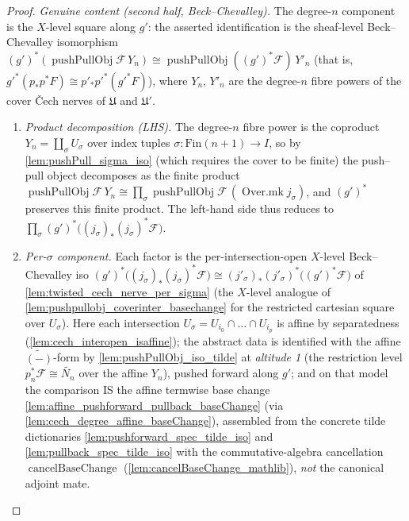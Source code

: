 \begin{proof}
  \emph{Genuine content (second half, Beck--Chevalley).} The degree-\(n\) component
  is the \(X\)-level square along \(g'\): the asserted identification is the sheaf-level
  Beck--Chevalley isomorphism \((g')^*(\operatorname{pushPullObj}\mathcal{F}\, Y_n) \cong
  \operatorname{pushPullObj}((g')^*\mathcal{F})\, Y'_n\) (that is, \(g'^*(p_* p^* F) \cong
  p'_* p'^*(g'^* F)\)), where \(Y_n\), \(Y'_n\) are the degree-\(n\) fibre powers of the
  cover {\v C}ech nerves of \(\mathfrak{U}\) and \(\mathfrak{U}'\).
  \begin{enumerate}
    \item \emph{Product decomposition (LHS).} The degree-\(n\) fibre power is the coproduct
      \(Y_n = \coprod_\sigma U_\sigma\) over index tuples \(\sigma : \mathrm{Fin}(n+1) \to I\),
      so by \cref{lem:pushPull_sigma_iso} (which requires the cover to be finite) the push--pull
      object decomposes as the finite product \(\operatorname{pushPullObj}\mathcal{F}\, Y_n \cong
      \prod_\sigma \operatorname{pushPullObj}\mathcal{F}\,(\operatorname{Over.mk} j_\sigma)\),
      and \((g')^*\) preserves this finite product. The left-hand side thus reduces to
      \(\prod_\sigma (g')^*\bigl((j_\sigma)_*(j_\sigma)^*\mathcal{F}\bigr)\).
    \item \emph{Per-\(\sigma\) component.} Each factor is the per-intersection-open \(X\)-level
      Beck--Chevalley iso \((g')^*\bigl((j_\sigma)_*(j_\sigma)^*\mathcal{F}\bigr) \cong
      (j'_\sigma)_*(j'_\sigma)^*\bigl((g')^*\mathcal{F}\bigr)\) of
      \cref{lem:twisted_cech_nerve_per_sigma} (the \(X\)-level analogue of
      \cref{lem:pushpullobj_coverinter_basechange} for the restricted cartesian square over
      \(U_\sigma\)). Here each intersection \(U_\sigma = U_{i_0} \cap \dots \cap U_{i_p}\) is
      affine by separatedness (\cref{lem:cech_interopen_isaffine}); the abstract data is
      identified with the affine \(\widetilde{(-)}\)-form by \cref{lem:pushPullObj_iso_tilde}
      at \emph{altitude 1} (the restriction level \(p_n^*\mathcal{F} \cong \widetilde{N_n}\)
      over the affine \(Y_n\)), pushed forward along \(g'\); and on that model the comparison
      IS the affine termwise base change \cref{lem:affine_pushforward_pullback_baseChange}
      (via \cref{lem:cech_degree_affine_baseChange}), assembled from the concrete tilde
      dictionaries \cref{lem:pushforward_spec_tilde_iso} and
      \cref{lem:pullback_spec_tilde_iso} with the commutative-algebra cancellation
      \(\operatorname{cancelBaseChange}\) (\cref{lem:cancelBaseChange_mathlib}), \emph{not}
      the canonical adjoint mate.

\end{enumerate}
\end{proof}

